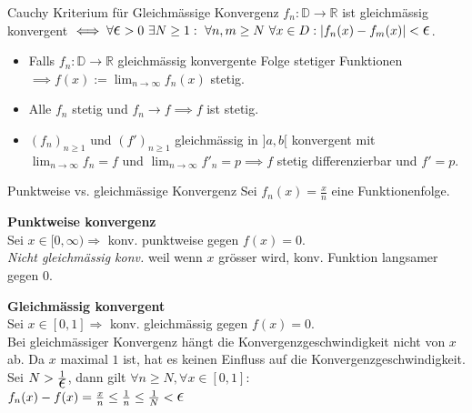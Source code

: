 \documentclass[a4paper]{article}
\let\oldepsilon\epsilon
\renewcommand{\epsilon}{\text{\Large $\oldepsilon$}}
\def\limn{\lim_{n\to \infty}}
\newcommand\R{\ensuremath{\mathbb{R}}}
\begin{document}
\begin{subbox}{Cauchy Kriterium für Gleichmässige Konvergenz}
  $f_n : \mathbb{D} \to \R$ ist gleichmässig konvergent $\iff \forall \epsilon > 0 \ \exists N \ge 1: \ \forall n,m \ge N \ \forall x \in D: \left| f_n(x) - f_m(x) \right| < \epsilon$.
\end{subbox}

\begin{itemize}[leftmargin=4.5mm, topsep=1pt, parsep=1pt]
  \item Falls $f_n:\mathbb{D} \to \R$ gleichmässig konvergente Folge stetiger Funktionen $\implies f(x) := \lim_{n \to \infty} f_n(x)$ stetig.
  \item Alle $f_n$ stetig und $f_n \to f \implies f$ ist stetig.
  \item $(f_n)_{n \geq 1}$ und $(f')_{n \geq 1}$ gleichmässig in $]a, b[$ konvergent mit $\limn f_n = f$ und $\limn f'_n = p \implies f$ stetig differenzierbar und $f' = p$.
\end{itemize}


\begin{bspbox}{Punktweise vs. gleichmässige Konvergenz}
  Sei $f_n(x) = \frac{x}{n}$ eine Funktionenfolge.

  \textbf{Punktweise konvergenz} \\
  Sei $x \in [0,\infty) \Rightarrow$ konv. punktweise gegen $f(x) = 0$. \\ 
  
  \textit{Nicht gleichmässig konv.} weil wenn $x$ grösser wird, konv. Funktion langsamer gegen 0.
  
  \textbf{Gleichmässig konvergent} \\
  Sei $x \in [0, 1] \Rightarrow$ konv. gleichmässig gegen $f(x) = 0$. \\
  
  Bei gleichmässiger Konvergenz hängt die Konvergenzgeschwindigkeit nicht von $x$ ab. 
  Da $x$ maximal $1$ ist, hat es keinen Einfluss auf die Konvergenzgeschwindigkeit. \\
  Sei $N > \frac{1}{\epsilon}$, dann gilt $\forall n \geq N, \forall x \in [0,1]:$ \\  
  $f_n(x)-f(x) = \frac{x}{n} \leq \frac{1}{n} \leq \frac{1}{N} < \epsilon$ 
\end{bspbox}
\end{document}
